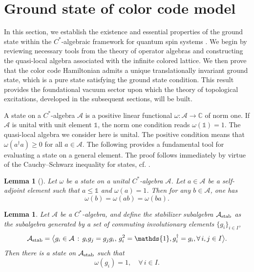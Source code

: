 \documentclass[a4paper,11pt]{article}
\newtheorem{lemma}[theorem]{Lemma}
\newcommand{\identity}{\mathds{1}}
\theoremstyle{definition}
\theoremstyle{remark}
\theoremstyle{remark}
\begin{document}
\section{Ground state of color code model}
\label{sec:GS}

In this section, we establish the existence and essential properties of the ground state within the $C^*$-algebraic framework for quantum spin systems \cite{bratteli1987operator,bratteli1997operator}. We begin by reviewing necessary tools from the theory of operator algebras and constructing the quasi-local algebra associated with the infinite colored lattice. We then prove that the color code Hamiltonian admits a unique translationally invariant ground state, which is a pure state satisfying the ground state condition. This result provides the foundational vacuum sector upon which the theory of topological excitations, developed in the subsequent sections, will be built.


A state on a $C^*$-algebra $\mathcal{A}$ is a positive linear functional $\omega:\mathcal{A} \to \mathbb{C}$ of norm one. 
If $\mathcal{A}$ is unital with unit element $\identity$, the norm one condition reads $\omega(\identity)=1$. 
The quasi-local algebra we consider here is unital. 
The positive condition means that $\omega(a^{\dagger}a)\geq 0$ for all $a\in \mathcal{A}$. 
The following provides a fundamental tool for evaluating a state on a general element. 
The proof follows immediately by virtue of the Cauchy--Schwarz inequality for states, cf. \cite{alicki2007statistical}. 

\begin{lemma}[{\cite[Section~2.1.1]{alicki2007statistical}}] \label{lem:evaluate_state}
    Let $\omega$ be a state on a unital $C^*$-algebra $\mathcal{A}$. Let $a\in \mathcal{A}$ be a self-adjoint element such that $a\leq \identity$ and $\omega(a)=1$. Then for any $b\in \mathcal{A}$, one has 
    \begin{equation*}
        \omega(b) = \omega(ab) = \omega(ba). 
    \end{equation*}
\end{lemma}


\begin{lemma} \label{lem:state_abelian}
    Let $\mathcal{A}$ be a $C^*$-algebra, and define the \emph{stabilizer subalgebra} $\mathcal{A}_{\rm stab}$ as the subalgebra generated by a set of commuting involutionary elements $\{g_i\}_{i\in I}$, 
    \[
    \mathcal{A}_{\rm stab} = \big\langle g_i \in \mathcal{A} \,:\, g_i g_j = g_j g_i,  \, g_i^2 = \identity, g_i^{\dagger}=g_i, \forall \,i,j \in I \big\rangle.
    \]
Then there is a state on $\mathcal{A}_{\rm stab}$ such that
    \begin{equation*}
        \omega(g_i) = 1, \quad \forall\, i \in I.
    \end{equation*}
\end{lemma}
\end{document}
